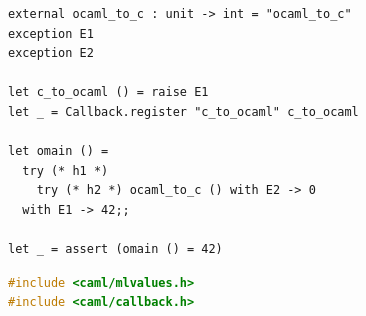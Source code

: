 \documentclass[sigplan,10pt,review,anonymous]{acmart}\settopmatter{printfolios=true,printccs=false,printacmref=false}
\begin{document}
\begin{figure}
\begin{minipage}{0.59\linewidth}
	\begin{minipage}{\linewidth}
		\begin{lstlisting}
external ocaml_to_c : unit -> int = "ocaml_to_c"
exception E1
exception E2

let c_to_ocaml () = raise E1
let _ = Callback.register "c_to_ocaml" c_to_ocaml

let omain () =
  try (* h1 *)
    try (* h2 *) ocaml_to_c () with E2 -> 0
  with E1 -> 42;;

let _ = assert (omain () = 42)
		\end{lstlisting}
    \label{code:meander_ml}
	\end{minipage}
	\begin{minipage}{\linewidth}
		\begin{lstlisting}[language=c]
#include <caml/mlvalues.h>
#include <caml/callback.h>


\end{lstlisting}
\end{minipage}
\end{minipage}
\end{figure}
\end{document}
